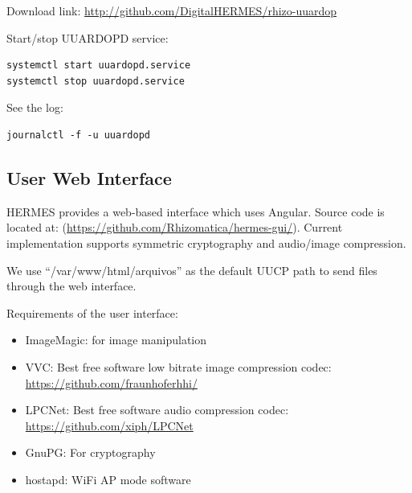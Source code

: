 \documentclass[11pt,a4paper]{article}
\begin{document}
Download link: \url{http://github.com/DigitalHERMES/rhizo-uuardop}

Start/stop UUARDOPD service:
\begin{verbatim}
systemctl start uuardopd.service
systemctl stop uuardopd.service
\end{verbatim}


See the log:
\begin{verbatim}
journalctl -f -u uuardopd
\end{verbatim}





\subsection{User Web Interface}

HERMES provides a web-based interface which uses Angular. Source
code is located at:
(\url{https://github.com/Rhizomatica/hermes-gui/}). Current
implementation supports symmetric cryptography and audio/image compression.

We use ``/var/www/html/arquivos'' as the default UUCP path to send
files through the web interface.

Requirements of the user interface:

\begin{itemize}
\item ImageMagic: for image manipulation
\item VVC: Best free software low bitrate image compression codec: \url{https://github.com/fraunhoferhhi/}
\item LPCNet: Best free software audio compression codec: \url{https://github.com/xiph/LPCNet}
\item GnuPG: For cryptography
\item hostapd: WiFi AP mode software
\end{itemize}
\end{document}
